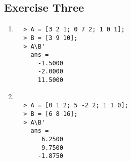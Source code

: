\documentclass{article}
\begin{document}
\subsection{Exercise Three}
 \begin{enumerate}
   \item
     \begin{verbatim}
  > A = [3 2 1; 0 7 2; 1 0 1];
  > B = [3 9 10];
  > A\B'
    ans =
      -1.5000
      -2.0000
      11.5000
     \end{verbatim}
  \item
     \begin{verbatim}

  > A = [0 1 2; 5 -2 2; 1 1 0];
  > B = [6 8 16];
  > A\B'
    ans =
       6.2500
       9.7500
      -1.8750
     \end{verbatim}
 \end{enumerate}
  
\end{document}

